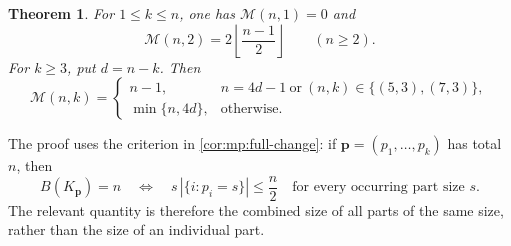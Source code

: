 \documentclass[11pt,reqno]{amsart}
\numberwithin{equation}{section}
\newtheorem{theorem}{Theorem}[section]
\theoremstyle{definition}
\theoremstyle{remark}
\begin{document}
\begin{theorem}
\label{ext:ordinary}
For $1\le k\le n$, one has $\mathcal M(n,1)=0$ and
\[
  \mathcal M(n,2)=2\left\lfloor\frac{n-1}{2}\right\rfloor
  \qquad(n\ge2).
\]
For $k\ge3$, put $d=n-k$.  Then
\[
  \mathcal M(n,k)=
  \begin{cases}
    n-1,& n=4d-1\ \text{or}\ (n,k)\in\{(5,3),(7,3)\},\\[2pt]
    \min\{n,4d\},&\text{otherwise}.
  \end{cases}
\]
\end{theorem}

The proof uses the criterion in \cref{cor:mp:full-change}:
if $\mathbf p=(p_1,\ldots,p_k)$ has total $n$, then
\begin{equation}
\label{ext:full-change}
 B(K_{\mathbf p})=n
 \quad\Longleftrightarrow\quad
 s\,|\{i:p_i=s\}|\le\frac n2
 \quad\text{for every occurring part size }s.
\end{equation}
The relevant quantity is therefore the combined size of all parts of
the same size, rather than the size of an individual part.
\end{document}
